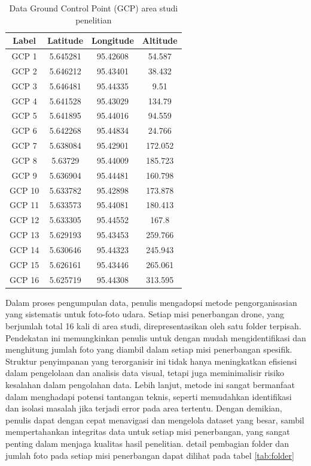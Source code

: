 \begin{table} [H]
\centering
\caption{Data Ground Control Point (GCP) area studi penelitian}
\begin{tabular}{|c|c|c|c|}
\hline
\textbf{Label} & \textbf{Latitude} & \textbf{Longitude} & \textbf{Altitude} \\
\hline
GCP 1 & 5.645281 & 95.42608 & 54.587 \\
GCP 2 & 5.646212 & 95.43401 & 38.432 \\
GCP 3 & 5.646481 & 95.44335 & 9.51 \\
GCP 4 & 5.641528 & 95.43029 & 134.79 \\
GCP 5 & 5.641895 & 95.44016 & 94.559 \\
GCP 6 & 5.642268 & 95.44834 & 24.766 \\
GCP 7 & 5.638084 & 95.42901 & 172.052 \\
GCP 8 & 5.63729 & 95.44009 & 185.723 \\
GCP 9 & 5.636904 & 95.44481 & 160.798 \\
GCP 10 & 5.633782 & 95.42898 & 173.878 \\
GCP 11 & 5.633573 & 95.44081 & 180.413 \\
GCP 12 & 5.633305 & 95.44552 & 167.8 \\
GCP 13 & 5.629193 & 95.43453 & 259.766 \\
GCP 14 & 5.630646 & 95.44323 & 245.943 \\
GCP 15 & 5.626161 & 95.43446 & 265.061 \\
GCP 16 & 5.625719 & 95.44308 & 313.595 \\
\hline
\end{tabular}
\label{tab:gcp_data}
\end{table}

\par Dalam proses pengumpulan data, penulis mengadopsi metode pengorganisasian yang sistematis untuk foto-foto udara. Setiap misi penerbangan drone, yang berjumlah total 16 kali di area studi, direpresentasikan oleh satu folder terpisah. Pendekatan ini memungkinkan penulis untuk dengan mudah mengidentifikasi dan menghitung jumlah foto yang diambil dalam setiap misi penerbangan spesifik. Struktur penyimpanan yang terorganisir ini tidak hanya meningkatkan efisiensi dalam pengelolaan dan analisis data visual, tetapi juga meminimalisir risiko kesalahan dalam pengolahan data. Lebih lanjut, metode ini sangat bermanfaat dalam menghadapi potensi tantangan teknis, seperti memudahkan identifikasi dan isolasi masalah jika terjadi error pada area tertentu. Dengan demikian, penulis dapat dengan cepat menavigasi dan mengelola dataset yang besar, sambil mempertahankan integritas data untuk setiap misi penerbangan, yang sangat penting dalam menjaga kualitas hasil penelitian. detail pembagian folder dan jumlah foto pada setiap misi penerbangan dapat dilihat pada tabel \ref{tab:folder}

